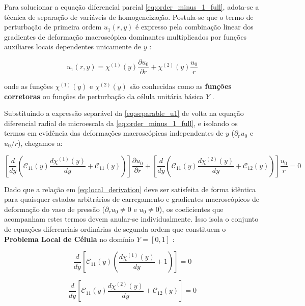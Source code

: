 Para solucionar a equação diferencial parcial \eqref{eq:order_minus_1_full}, adota-se a técnica de separação de variáveis de homogeneização. Postula-se que o termo de perturbação de primeira ordem $u_1(r, y)$ é expresso pela combinação linear dos gradientes de deformação macroscópica dominantes multiplicados por funções auxiliares locais dependentes unicamente de $y$ \cite{bakhvalov1989}:

\begin{equation}
  u_1(r, y) = \chi^{(1)}(y) \frac{\partial u_0}{\partial r} + \chi^{(2)}(y) \frac{u_0}{r}
  \label{eq:separable_u1}
\end{equation}

onde as funções $\chi^{(1)}(y)$ e $\chi^{(2)}(y)$ são conhecidas como as \textbf{funções corretoras} ou funções de perturbação da célula unitária básica $Y$ \cite{bakhvalov1989}.

Substituindo a expressão separável da \eqref{eq:separable_u1} de volta na equação diferencial radial de microescala da \eqref{eq:order_minus_1_full}, e isolando os termos em evidência das deformações macroscópicas independentes de $y$ ($\partial_r u_0$ e $u_0/r$), chegamos a:

\begin{equation}
  \left[ \frac{d}{d y} \left( \mathcal{C}_{11}(y) \frac{d \chi^{(1)}(y)}{d y} + \mathcal{C}_{11}(y) \right) \right] \frac{\partial u_0}{\partial r} + \left[ \frac{d}{d y} \left( \mathcal{C}_{11}(y) \frac{d \chi^{(2)}(y)}{d y} + \mathcal{C}_{12}(y) \right) \right] \frac{u_0}{r} = 0
  \label{eq:local_derivation}
\end{equation}

Dado que a relação em \eqref{eq:local_derivation} deve ser satisfeita de forma idêntica para quaisquer estados arbitrários de carregamento e gradientes macroscópicos de deformação do vaso de pressão ($\partial_r u_0 \neq 0$ e $u_0 \neq 0$), os coeficientes que acompanham estes termos devem anular-se individualmente. Isso isola o conjunto de equações diferenciais ordinárias de segunda ordem que constituem o \textbf{Problema Local de Célula} no domínio $Y = [0, 1]$ \cite{bakhvalov1989}:

\begin{equation}
  \frac{d}{d y} \left[ \mathcal{C}_{11}(y) \left( \frac{d \chi^{(1)}(y)}{d y} + 1 \right) \right] = 0
  \label{eq:local_eq1}
\end{equation}

\begin{equation}
  \frac{d}{d y} \left[ \mathcal{C}_{11}(y) \frac{d \chi^{(2)}(y)}{d y} + \mathcal{C}_{12}(y) \right] = 0
  \label{eq:local_eq2}
\end{equation}

